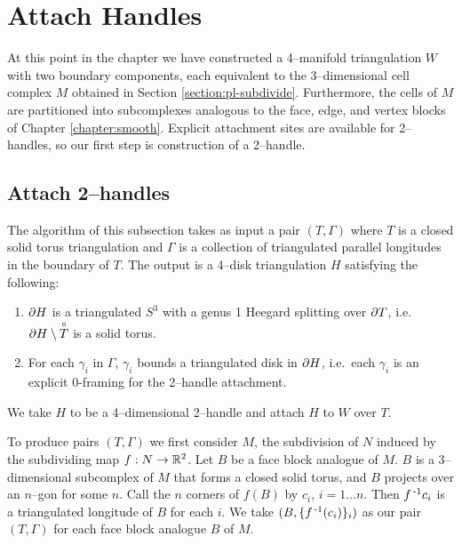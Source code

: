 \section{Attach Handles}
\label{section:pl-handle}

At this point in the chapter we have constructed a 4--manifold triangulation $W$ with two boundary components, each equivalent to the 3--dimensional cell complex $M$ obtained in Section \ref{section:pl-subdivide}.
Furthermore, the cells of $M$ are partitioned into subcomplexes analogous to the face, edge, and vertex blocks of Chapter \ref{chapter:smooth}.
Explicit attachment sites are available for 2--handles, so our first step is construction of a 2--handle.

\subsection{Attach 2--handles}
\label{section:pl-2-handle}

The algorithm of this subsection takes as input a pair $(T,\Gamma)$ where $T$ is a closed solid torus triangulation and $\Gamma$ is a collection of triangulated parallel longitudes in the boundary of $T$.
The output is a 4--disk triangulation $H$ satisfying the following:
\begin{enumerate}
	\item $\partial H$ is a triangulated $S^3$ with a genus 1 Heegard splitting over $\partial T$, i.e.\ $\partial H\setminus \overset{\circ}{T}$ is a solid torus.
	\item For each $\gamma_i$ in $\Gamma$, $\gamma_i$ bounds a triangulated disk in $\partial H$, i.e.\ each $\gamma_i$ is an explicit 0-framing for the 2--handle attachment.
\end{enumerate}
We take $H$ to be a 4--dimensional 2--handle and attach $H$ to $W$ over $T$.

To produce pairs $(T,\Gamma)$ we first consider $M$, the subdivision of $N$ induced by the subdividing map $f:N\to\mathbb{R}^2$.
Let $B$ be a face block analogue of $M$.
$B$ is a 3--dimensional subcomplex of $M$ that forms a closed solid torus,
and $B$ projects over an $n$--gon for some $n$.
Call the $n$ corners of $f(B)$ by $c_i$, $i=1\dots n$.
Then $f^{\,\text{-}1} c_i$ is a triangulated longitude of $B$ for each $i$.
We take $(B, \{f^{\,\text{-}1}(c_i)\}_i)$ as our pair $(T,\Gamma)$ for each face block analogue $B$ of $M$.



